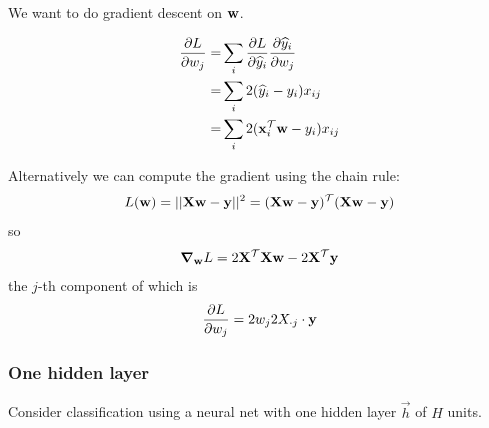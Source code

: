 We want to do gradient descent on $\mathbf w$.

\begin{align*}
  \frac{\partial L}{\partial w_j}
  =& \sum_i \frac{\partial L}{\partial \widehat{y}_i} \frac{\partial \widehat{y}_i}{\partial w_j} \\
  =& \sum_i 2(\widehat{y}_i - y_i) x_{ij} \\
  =& \sum_i 2(\mathbf x_i^\mathcal T \mathbf w - y_i) x_{ij} \\
\end{align*}

Alternatively we can compute the gradient using the chain rule:
\begin{align*}
L(\mathbf w) = ||\mathbf X\mathbf w - \mathbf y||^2 = (\mathbf X\mathbf w - \mathbf y)^\mathcal T(\mathbf X\mathbf w - \mathbf y)
\end{align*}
so
\begin{align*}
  \grad_\mathbf w L = 2\mathbf X^\mathcal T\mathbf X\mathbf w - 2\mathbf X^\mathcal T \mathbf y
\end{align*}
the $j$-th component of which is
\begin{align*}
  \frac{\partial L}{\partial w_j} = 2w_j 2X_{\cdot j} \cdot \mathbf y
\end{align*}

\subsubsection{One hidden layer}
Consider classification using a neural net with one hidden layer $\vec h$ of $H$ units.

